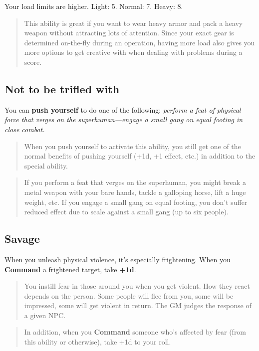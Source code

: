 \documentclass[11pt,fleqn,a5paper]{book}
\newcommand{\gameterm}[1]{\textbf{#1}}
\begin{document}
Your load limits are higher. Light: 5. Normal: 7. Heavy: 8.

\begin{quote}
	This ability is great if you want to wear heavy armor and pack a heavy weapon without attracting lots of attention. Since your exact gear is determined on-the-fly during an operation, having more load also gives you more options to get creative with when dealing with problems during a score.
\end{quote} 

\subsection{Not to be trifled with}

You can \textbf{push yourself} to do one of the following: \emph{perform a feat of physical force that verges on the superhuman---engage a small gang on equal footing in close combat.}

\begin{quote}
	When you push yourself to activate this ability, you still get one of the normal benefits of pushing yourself (+1d, +1 effect, etc.) in addition to the special ability.
\end{quote} 

\begin{quote}
	If you perform a feat that verges on the superhuman, you might break a metal weapon with your bare hands, tackle a galloping horse, lift a huge weight, etc. If you engage a small gang on equal footing, you don’t suffer reduced effect due to scale against a small gang (up to six people).
\end{quote} 

\subsection{Savage}

When you unleash physical violence, it’s especially frightening. When you \gameterm{Command}  a frightened target, take \textbf{+1d}.

\begin{quote}
	You instill fear in those around you when you get violent. How they react depends on the person. Some people will flee from you, some will be impressed, some will get violent in return. The GM judges the response of a given NPC.
\end{quote} 

\begin{quote}
	In addition, when you \gameterm{Command}  someone who’s affected by fear (from this ability or otherwise), take +1d to your roll.
\end{quote} 
\end{document}
